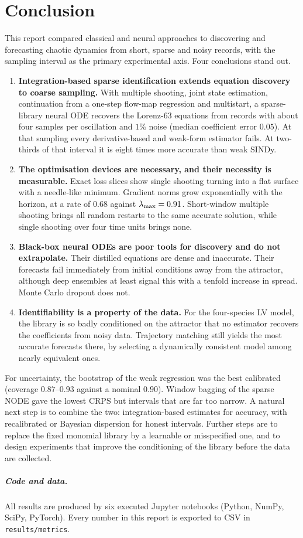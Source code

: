 \chapter{Conclusion}\label{ch:conclusion}

This report compared classical and neural approaches to discovering and forecasting chaotic dynamics from short, sparse and noisy records, with the sampling interval as the primary experimental axis. Four conclusions stand out.

\begin{enumerate}
  \item \textbf{Integration-based sparse identification extends equation discovery to coarse sampling.} With multiple shooting, joint state estimation, continuation from a one-step flow-map regression and multistart, a sparse-library neural ODE recovers the Lorenz-63 equations from records with about four samples per oscillation and $1\%$ noise (median coefficient error $0.05$). At that sampling every derivative-based and weak-form estimator fails. At two-thirds of that interval it is eight times more accurate than weak SINDy.
  \item \textbf{The optimisation devices are necessary, and their necessity is measurable.} Exact loss slices show single shooting turning into a flat surface with a needle-like minimum. Gradient norms grow exponentially with the horizon, at a rate of $0.68$ against $\lambda_{\max}=0.91$. Short-window multiple shooting brings all random restarts to the same accurate solution, while single shooting over four time units brings none.
  \item \textbf{Black-box neural ODEs are poor tools for discovery and do not extrapolate.} Their distilled equations are dense and inaccurate. Their forecasts fail immediately from initial conditions away from the attractor, although deep ensembles at least signal this with a tenfold increase in spread. Monte Carlo dropout does not.
  \item \textbf{Identifiability is a property of the data.} For the four-species LV model, the library is so badly conditioned on the attractor that no estimator recovers the coefficients from noisy data. Trajectory matching still yields the most accurate forecasts there, by selecting a dynamically consistent model among nearly equivalent ones.
\end{enumerate}

For uncertainty, the bootstrap of the weak regression was the best calibrated (coverage $0.87$--$0.93$ against a nominal $0.90$). Window bagging of the sparse NODE gave the lowest CRPS but intervals that are far too narrow. A natural next step is to combine the two: integration-based estimates for accuracy, with recalibrated or Bayesian dispersion for honest intervals. Further steps are to replace the fixed monomial library by a learnable or misspecified one, and to design experiments that improve the conditioning of the library before the data are collected.

\paragraph{Code and data.} All results are produced by six executed Jupyter notebooks (Python, NumPy, SciPy, PyTorch). Every number in this report is exported to CSV in \texttt{results/metrics}.
